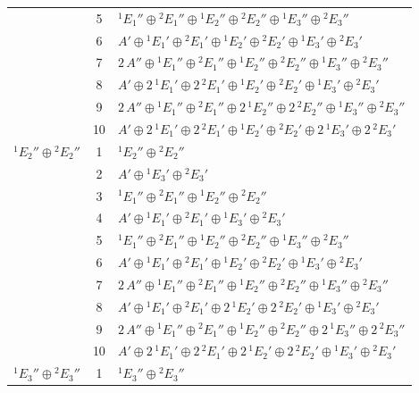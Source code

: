 \documentclass[11pt]{article}
\begin{document}
\begin{longtable}{l c p{}}
 & 5 & ${}^{1}E_{1}''\oplus {}^{2}E_{1}''\oplus {}^{1}E_{2}''\oplus {}^{2}E_{2}''\oplus {}^{1}E_{3}''\oplus {}^{2}E_{3}''$\\
 & 6 & $A'\oplus {}^{1}E_{1}'\oplus {}^{2}E_{1}'\oplus {}^{1}E_{2}'\oplus {}^{2}E_{2}'\oplus {}^{1}E_{3}'\oplus {}^{2}E_{3}'$\\
 & 7 & $2\,A''\oplus {}^{1}E_{1}''\oplus {}^{2}E_{1}''\oplus {}^{1}E_{2}''\oplus {}^{2}E_{2}''\oplus {}^{1}E_{3}''\oplus {}^{2}E_{3}''$\\
 & 8 & $A'\oplus 2\,{}^{1}E_{1}'\oplus 2\,{}^{2}E_{1}'\oplus {}^{1}E_{2}'\oplus {}^{2}E_{2}'\oplus {}^{1}E_{3}'\oplus {}^{2}E_{3}'$\\
 & 9 & $2\,A''\oplus {}^{1}E_{1}''\oplus {}^{2}E_{1}''\oplus 2\,{}^{1}E_{2}''\oplus 2\,{}^{2}E_{2}''\oplus {}^{1}E_{3}''\oplus {}^{2}E_{3}''$\\
 & 10 & $A'\oplus 2\,{}^{1}E_{1}'\oplus 2\,{}^{2}E_{1}'\oplus {}^{1}E_{2}'\oplus {}^{2}E_{2}'\oplus 2\,{}^{1}E_{3}'\oplus 2\,{}^{2}E_{3}'$\\
\hline
${}^{1}E_{2}''\oplus {}^{2}E_{2}''$ & 1 & ${}^{1}E_{2}''\oplus {}^{2}E_{2}''$\\
 & 2 & $A'\oplus {}^{1}E_{3}'\oplus {}^{2}E_{3}'$\\
 & 3 & ${}^{1}E_{1}''\oplus {}^{2}E_{1}''\oplus {}^{1}E_{2}''\oplus {}^{2}E_{2}''$\\
 & 4 & $A'\oplus {}^{1}E_{1}'\oplus {}^{2}E_{1}'\oplus {}^{1}E_{3}'\oplus {}^{2}E_{3}'$\\
 & 5 & ${}^{1}E_{1}''\oplus {}^{2}E_{1}''\oplus {}^{1}E_{2}''\oplus {}^{2}E_{2}''\oplus {}^{1}E_{3}''\oplus {}^{2}E_{3}''$\\
 & 6 & $A'\oplus {}^{1}E_{1}'\oplus {}^{2}E_{1}'\oplus {}^{1}E_{2}'\oplus {}^{2}E_{2}'\oplus {}^{1}E_{3}'\oplus {}^{2}E_{3}'$\\
 & 7 & $2\,A''\oplus {}^{1}E_{1}''\oplus {}^{2}E_{1}''\oplus {}^{1}E_{2}''\oplus {}^{2}E_{2}''\oplus {}^{1}E_{3}''\oplus {}^{2}E_{3}''$\\
 & 8 & $A'\oplus {}^{1}E_{1}'\oplus {}^{2}E_{1}'\oplus 2\,{}^{1}E_{2}'\oplus 2\,{}^{2}E_{2}'\oplus {}^{1}E_{3}'\oplus {}^{2}E_{3}'$\\
 & 9 & $2\,A''\oplus {}^{1}E_{1}''\oplus {}^{2}E_{1}''\oplus {}^{1}E_{2}''\oplus {}^{2}E_{2}''\oplus 2\,{}^{1}E_{3}''\oplus 2\,{}^{2}E_{3}''$\\
 & 10 & $A'\oplus 2\,{}^{1}E_{1}'\oplus 2\,{}^{2}E_{1}'\oplus 2\,{}^{1}E_{2}'\oplus 2\,{}^{2}E_{2}'\oplus {}^{1}E_{3}'\oplus {}^{2}E_{3}'$\\
\hline
${}^{1}E_{3}''\oplus {}^{2}E_{3}''$ & 1 & ${}^{1}E_{3}''\oplus {}^{2}E_{3}''$\\

\end{longtable}
\end{document}
